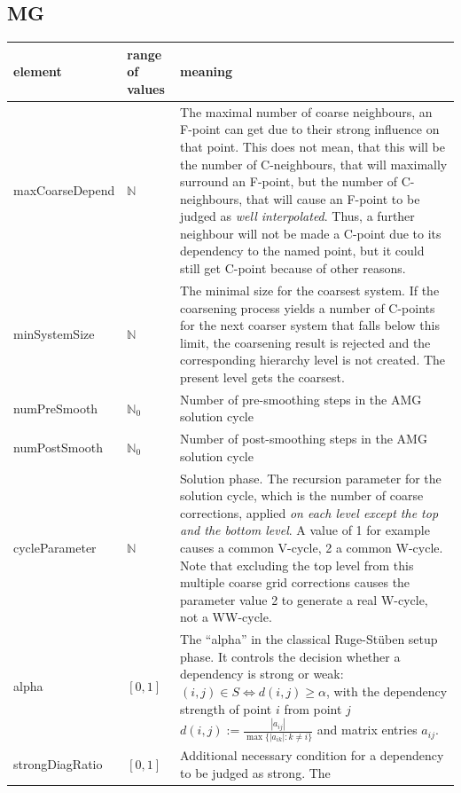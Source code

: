 \subsection{MG}
%
%
\begin{center}
\begin{tabular}{llp{}}
\toprule
element & range of values & meaning \\
\midrule
maxCoarseDepend & $\mathbb{N}$ &
The maximal number of coarse neighbours, an F-point can get due to their
strong influence on that point. This does not mean, that this will be the
number of C-neighbours, that will maximally surround an F-point, but the number
of C-neighbours, that will cause an F-point to be judged as
\emph{well interpolated}. Thus, a further neighbour will not be made a
C-point due to its dependency to the named point, but it could still get
C-point because of other reasons.\\
%
%
\midrule
%
%
minSystemSize & $\mathbb{N}$ &
The minimal size for the coarsest system. If the coarsening process yields a
number of C-points for the next coarser system that falls below this limit, the
coarsening result is rejected and the corresponding hierarchy level is not
created. The present level gets the coarsest.\\
%
%
\midrule
%
%
numPreSmooth & $\mathbb{N}_0$ &
Number of pre-smoothing steps in the AMG solution cycle\\
%
%
\midrule
%
%
numPostSmooth & $\mathbb{N}_0$ &
Number of post-smoothing steps in the AMG solution cycle\\
%
%
\midrule
%
%
cycleParameter & $\mathbb{N}$ &
Solution phase. The recursion parameter for the solution cycle, which is the
number of coarse corrections, applied \emph{on each level except the top
and the bottom level}. A value of 1 for example causes a common V-cycle, 2 a
common W-cycle. Note that excluding the top level from this multiple coarse
grid corrections causes the parameter value 2 to generate a real W-cycle, not
a WW-cycle.\\
%
%
\midrule
%
%
alpha & $[0,1]$ &
The ``alpha'' in the classical Ruge-St\"{u}ben setup phase. It controls the
decision whether a dependency is strong or weak:
$(i,j) \in S \Leftrightarrow d(i,j) \ge \alpha$, with the dependency strength
of point $i$ from point $j$
$\displaystyle d(i,j) := \frac{|a_{ij}|}{\max\{|a_{ik}| : k \ne i\}}$ and
matrix entries $a_{ij}$.\\
%
%
\midrule
%
%
strongDiagRatio & $[0,1]$ &
Additional necessary condition for a dependency to be judged as strong. The

\end{tabular}
\end{center}
